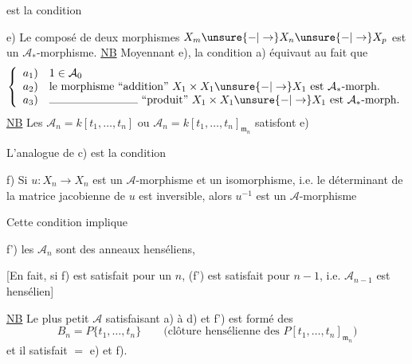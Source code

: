 est la condition

e) Le composé de deux morphismes $X_m\unsure{-|\to}X_n\unsure{-|\to}X_p$ est un $\mathcal A_*$-morphisme.
\uline{NB} Moyennant  e), la condition a) équivaut au fait que
\[
\left\{\begin{array}{ll}
a_1)&1\in\mathcal A_0\\
a_2)&\text{le morphisme ``addition'' }X_1\times X_1\unsure{-|\to}X_1\text{ est }\mathcal A_*\text{-morph.}\\
a_3)&\rule{2.8cm}{0.3pt}\text{ ``produit'' }X_1\times X_1\unsure{-|\to}X_1\text{ est }\mathcal A_*\text{-morph.}
\end{array}\right.
\]
\uline{NB} Les $\mathcal A_n=k[t_1,\ldots,t_n]$ ou $\mathcal A_n=k[t_1,\ldots,t_n]_{\mathfrak m_n}$ satisfont e)

L'analogue de c) est la condition

f) Si $u:X_n\longrightarrow X_n$ est un $\mathcal A$-morphisme et un isomorphisme,  i.e. le déterminant  de la matrice jacobienne de $u$ est inversible, alors $u^{-1}$ est un $\mathcal A$-morphisme

Cette condition implique 

f') les $\mathcal A_n$ sont des anneaux henséliens,

[En fait, si f) est satisfait pour un $n$, (f') est satisfait pour $n-1$, i.e. $\mathcal A_{n-1}$ est hensélien]

\uline{NB} Le plus petit $\mathcal A$ satisfaisant a) à d) et f') est formé des
\[
B_n=P\{t_1,\ldots,t_n\}\qquad\text{(clôture hensélienne des }P[t_1,\ldots,t_n]_{\mathfrak m_n}\text{)}
\]
et il satisfait $=$ e) et f).

